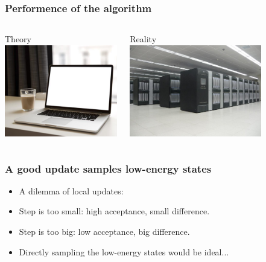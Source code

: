 \documentclass[xcolor=table, 10pt, aspectratio=169, ignorenonframetext]{beamer}
\begin{document}
\begin{frame}
  \frametitle{Performence of the algorithm}
    \begin{columns}
      \begin{center}
				Theory\\
				\vspace{.5cm}
        \includegraphics[height=4cm]{../slmctut/laptop_coffee}
      \end{center}
      \begin{center}
				Reality\\
				\vspace{.5cm}
        \includegraphics[height=4cm]{../slmctut/tianhe}
      \end{center}
    \end{columns}
\vspace{.5cm}
\end{frame}

\begin{frame}
  \frametitle{A good update samples low-energy states}
  \begin{center}
  \end{center}
  \begin{itemize}
    \item A dilemma of local updates:
    \item<1-> Step is too small: high acceptance, small difference.
    \item<2-> Step is too big: low acceptance, big difference.
    \item<3-> Directly sampling the low-energy states would be ideal...
  \end{itemize}
\end{frame}
\end{document}
